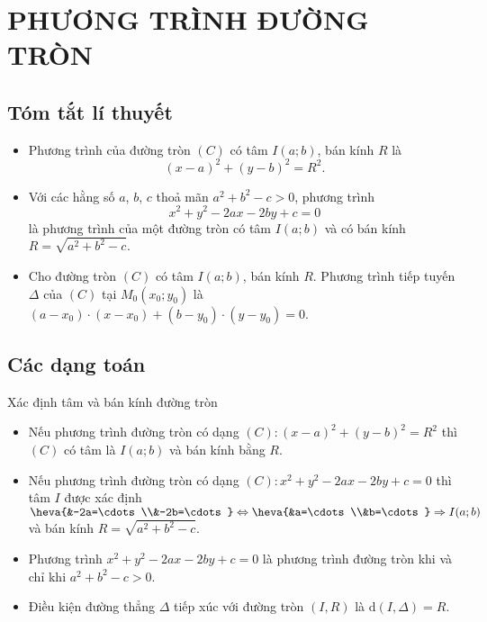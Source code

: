 \setcounter{dang}{0}
\section{PHƯƠNG TRÌNH ĐƯỜNG TRÒN}
\subsection{Tóm tắt lí thuyết}
\setcounter{ex}{0}
\setcounter{bt}{0}
\begin{itemize}
	\item Phương trình của đường tròn $(C)$ có tâm $I(a;b)$, bán kính $R$ là
	$$(x-a)^2+(y-b)^2=R^2.$$
	\item Với các hằng số $a$, $b$, $c$ thoả mãn $a^2+b^2-c>0$, phương trình
	$$x^2+y^2-2ax-2by+c=0$$
	là phương trình của một đường tròn có tâm $I(a;b)$ và có bán kính $R=\sqrt{a^2+b^2-c}$.
	\item Cho đường tròn $(C)$ có tâm $I(a;b)$, bán kính $R$. Phương trình tiếp tuyến $\Delta$ của $(C)$ tại $M_0\left(x_0; y_0\right)$ là $\left(a-x_0\right) \cdot \left(x-x_{0}\right)+\left(b-y_{0}\right) \cdot\left(y-y_{0}\right)=0$.
\end{itemize}
\subsection{Các dạng toán}
\begin{dang}{Xác định tâm và bán kính đường tròn}
	\begin{itemize}
		\item Nếu phương trình đường tròn có dạng $(C)\colon \left(x-a\right)^2+\left(y-b\right)^2=R^2$ thì $(C)$ có tâm là $I(a;b)$ và bán kính bằng $R$.
		\item Nếu phương trình đường tròn có dạng $(C)\colon x^2+y^2-2ax-2by+c=0$ thì tâm $I$ được xác định 
		$\heva{&-2a=\cdots\\&-2b=\cdots} \Leftrightarrow \heva{&a=\cdots\\&b=\cdots }\Rightarrow I(a;b)$ và bán kính $R=\sqrt{a^2+b^2-c}$.
	\end{itemize}
	\begin{note}
		\begin{itemize}
			\item Phương trình $x^2+y^2-2ax-2by+c=0$ là phương trình đường tròn khi và chỉ khi $a^2+b^2-c>0$.
			\item Điều kiện đường thẳng $\Delta$ tiếp xúc với đường tròn $(I,R)$ là $\mathrm{d}\left(I,\Delta\right)=R$.
		\end{itemize}
	\end{note}
\end{dang}
